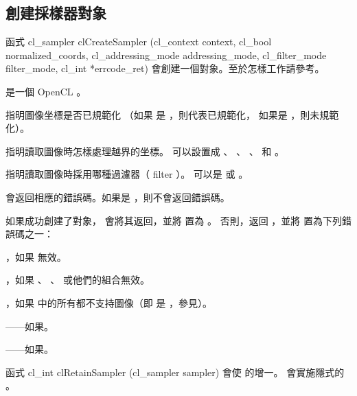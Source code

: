 \subsection{創建採樣器對象}

函式
\startclc
cl_sampler clCreateSampler (cl_context context,
			cl_bool normalized_coords,
			cl_addressing_mode addressing_mode,
			cl_filter_mode filter_mode,
			cl_int *errcode_ret)
\stopclc
會創建一個對象。至於怎樣工作請參考。

 是一個 OpenCL 。

 指明圖像坐標是否已規範化
（如果  是 ，則代表已規範化，
如果是 ，則未規範化）。

 指明讀取圖像時怎樣處理越界的坐標。
可以設置成 、 、
 、  和 。

 指明讀取圖像時採用哪種過濾器（ filter ）。
可以是  或 。

 會返回相應的錯誤碼。如果是 ，則不會返回錯誤碼。

如果成功創建了對象，  會將其返回，並將  置為 。
否則，返回 ，並將  置為下列錯誤碼之一：
\startigBase
\item {}，如果  無效。

\item {}，如果 、 、  或他們的組合無效。

\item {}，如果  中的所有都不支持圖像（即  是 ，參見）。

\item {}——如果\scdevfailres。

\item {}——如果\schostfailres。
\stopigBase

函式
\startclc
cl_int clRetainSampler (cl_sampler sampler)
\stopclc
會使  的增一。
 會實施隱式的 。

